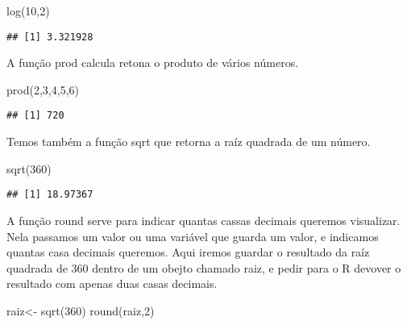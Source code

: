 \documentclass[
]{article}
\newenvironment{Shaded}{\begin{snugshade}}{\end{snugshade}}
\newcommand{\DecValTok}[1]{\textcolor[rgb]{0.00,0.00,0.81}{#1}}
\newcommand{\FunctionTok}[1]{\textcolor[rgb]{0.00,0.00,0.00}{#1}}
\newcommand{\NormalTok}[1]{#1}
\newcommand{\OtherTok}[1]{\textcolor[rgb]{0.56,0.35,0.01}{#1}}
\begin{document}
\begin{Shaded}
\begin{Highlighting}[]
\FunctionTok{log}\NormalTok{(}\DecValTok{10}\NormalTok{,}\DecValTok{2}\NormalTok{)}
\end{Highlighting}
\end{Shaded}

\begin{verbatim}
## [1] 3.321928
\end{verbatim}

A função prod calcula retona o produto de vários números.

\begin{Shaded}
\begin{Highlighting}[]
\FunctionTok{prod}\NormalTok{(}\DecValTok{2}\NormalTok{,}\DecValTok{3}\NormalTok{,}\DecValTok{4}\NormalTok{,}\DecValTok{5}\NormalTok{,}\DecValTok{6}\NormalTok{)}
\end{Highlighting}
\end{Shaded}

\begin{verbatim}
## [1] 720
\end{verbatim}

Temos também a função sqrt que retorna a raíz quadrada de um número.

\begin{Shaded}
\begin{Highlighting}[]
\FunctionTok{sqrt}\NormalTok{(}\DecValTok{360}\NormalTok{)}
\end{Highlighting}
\end{Shaded}

\begin{verbatim}
## [1] 18.97367
\end{verbatim}

A função round serve para indicar quantas cassas decimais queremos
visualizar. Nela passamos um valor ou uma variável que guarda um valor,
e indicamos quantas casa decimais queremos. Aqui iremos guardar o
resultado da raíz quadrada de 360 dentro de um obejto chamado raiz, e
pedir para o R devover o resultado com apenas duas casas decimais.

\begin{Shaded}
\begin{Highlighting}[]
\NormalTok{raiz}\OtherTok{\textless{}{-}} \FunctionTok{sqrt}\NormalTok{(}\DecValTok{360}\NormalTok{)}
\FunctionTok{round}\NormalTok{(raiz,}\DecValTok{2}\NormalTok{)}
\end{Highlighting}
\end{Shaded}
\end{document}
